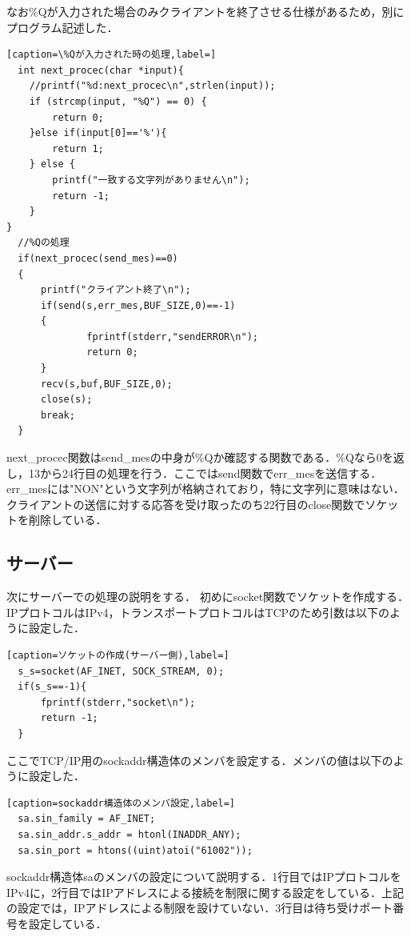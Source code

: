 \documentclass[11pt,a4j,titlepage]{jsarticle}
\begin{document}
なお\%Qが入力された場合のみクライアントを終了させる仕様があるため，別にプログラム記述した．
\begin{lstlisting}[caption=\%Qが入力された時の処理,label=]
  int next_procec(char *input){
    //printf("%d:next_procec\n",strlen(input));
    if (strcmp(input, "%Q") == 0) {
        return 0;
    }else if(input[0]=='%'){
        return 1;
    } else {
        printf("一致する文字列がありません\n");
        return -1;
    }
}
  //%Qの処理
  if(next_procec(send_mes)==0)
  {
      printf("クライアント終了\n");
      if(send(s,err_mes,BUF_SIZE,0)==-1)
      {
              fprintf(stderr,"sendERROR\n");
              return 0;
      }
      recv(s,buf,BUF_SIZE,0);
      close(s);
      break;
  }
\end{lstlisting}
next\_procec関数はsend\_mesの中身が\%Qか確認する関数である．\%Qなら0を返し，13から24行目の処理を行う．ここではsend関数でerr\_mesを送信する．err\_mesには"NON"という文字列が格納されており，特に文字列に意味はない．クライアントの送信に対する応答を受け取ったのち22行目のclose関数でソケットを削除している．
\subsection{サーバー}\label{sec:ser}
次にサーバーでの処理の説明をする．
初めにsocket関数でソケットを作成する．IPプロトコルはIPv4，トランスポートプロトコルはTCPのため引数は以下のように設定した．
\begin{lstlisting}[caption=ソケットの作成(サーバー側),label=]
  s_s=socket(AF_INET, SOCK_STREAM, 0);
  if(s_s==-1){
      fprintf(stderr,"socket\n");
      return -1;
  }
\end{lstlisting}

ここでTCP/IP用のsockaddr構造体のメンバを設定する．メンバの値は以下のように設定した．
\begin{lstlisting}[caption=sockaddr構造体のメンバ設定,label=]
  sa.sin_family = AF_INET;
  sa.sin_addr.s_addr = htonl(INADDR_ANY);
  sa.sin_port = htons((uint)atoi("61002"));
\end{lstlisting}
sockaddr構造体saのメンバの設定について説明する．1行目ではIPプロトコルをIPv4に，2行目ではIPアドレスによる接続を制限に関する設定をしている．上記の設定では，IPアドレスによる制限を設けていない．3行目は待ち受けポート番号を設定している．
\end{document}
